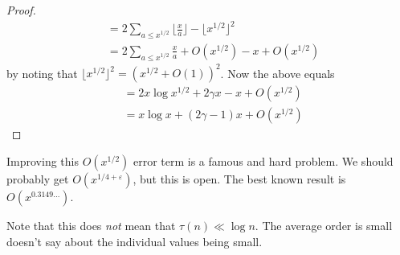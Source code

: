 \documentclass[a4paper]{article}
\begin{document}
\begin{thm}
\begin{proof}
\begin{equation*}
\begin{aligned}
&= 2 \sum_{a \leq x^{1/2}} \lfloor \frac{x}{a} \rfloor - \lfloor x^{1/2} \rfloor^2\\
&= 2 \sum_{a \leq x^{1/2}} \frac{x}{a} + O(x^{1/2}) - x + O(x^{1/2})
\end{aligned}
\end{equation*}
by noting that $\lfloor x^{1/2}\rfloor^2 = (x^{1/2} + O(1))^2$. Now the above equals
\begin{equation*}
\begin{aligned}
&=2x\log x^{1/2} + 2\gamma x - x + O(x^{1/2})\\
&= x\log x + (2\gamma-1) x + O(x^{1/2})
\end{aligned}
\end{equation*}
\end{proof}

Improving this $O(x^{1/2})$ error term is a famous and hard problem. We should probably get $O(x^{1/4+\varepsilon})$, but this is open. The best known result is $O(x^{0.3149...})$.
\end{thm}

Note that this does \emph{not} mean that $\tau(n) \ll \log n$. The average order is small doesn't say about the individual values being small.
\end{document}
